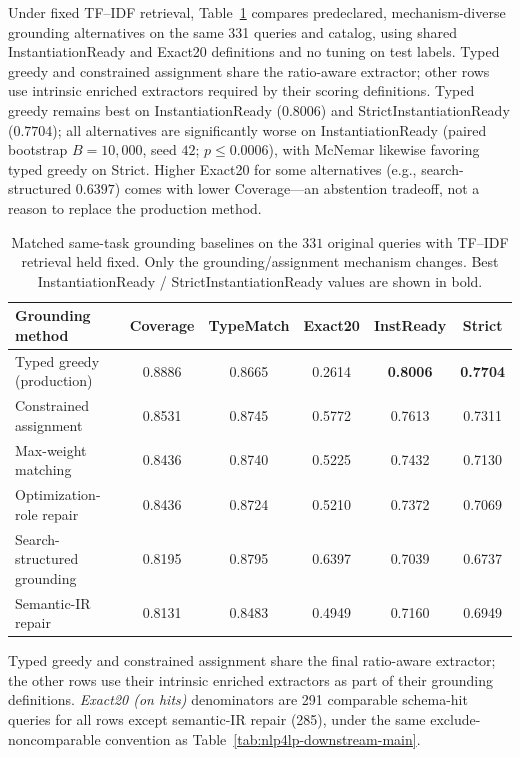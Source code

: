 \documentclass[pdflatex,sn-basic,Numbered]{sn-jnl}
\begin{document}
Under fixed TF--IDF retrieval, Table~\ref{tab:nlp4lp-grounding-baselines} compares predeclared, mechanism-diverse grounding alternatives on the same 331 queries and catalog, using shared InstantiationReady and Exact20 definitions and no tuning on test labels. Typed greedy and constrained assignment share the ratio-aware extractor; other rows use intrinsic enriched extractors required by their scoring definitions. Typed greedy remains best on InstantiationReady ($0.8006$) and StrictInstantiationReady ($0.7704$); all alternatives are significantly worse on InstantiationReady (paired bootstrap $B=10{,}000$, seed $42$; $p\leq 0.0006$), with McNemar likewise favoring typed greedy on Strict. Higher Exact20 for some alternatives (e.g., search-structured $0.6397$) comes with lower Coverage---an abstention tradeoff, not a reason to replace the production method.

\begin{table}[t]
  \centering
  \caption{Matched same-task grounding baselines on the $331$ original queries with TF--IDF retrieval held fixed. Only the grounding/assignment mechanism changes. Best InstantiationReady / StrictInstantiationReady values are shown in bold.}
  \label{tab:nlp4lp-grounding-baselines}
  \small
  \setlength{\tabcolsep}{2.8pt}
  \renewcommand{\arraystretch}{1.12}
  \begin{tabular}{@{}lccccc@{}}
    \toprule
    Grounding method & Coverage & TypeMatch & Exact20 & InstReady & Strict \\
    \midrule
    Typed greedy (production) & 0.8886 & 0.8665 & 0.2614 & \textbf{0.8006} & \textbf{0.7704} \\
    Constrained assignment & 0.8531 & 0.8745 & 0.5772 & 0.7613 & 0.7311 \\
    Max-weight matching & 0.8436 & 0.8740 & 0.5225 & 0.7432 & 0.7130 \\
    Optimization-role repair & 0.8436 & 0.8724 & 0.5210 & 0.7372 & 0.7069 \\
    Search-structured grounding & 0.8195 & 0.8795 & 0.6397 & 0.7039 & 0.6737 \\
    Semantic-IR repair & 0.8131 & 0.8483 & 0.4949 & 0.7160 & 0.6949 \\
    \bottomrule
  \end{tabular}

  \vspace{2mm}
  \raggedright
  \footnotesize
  Typed greedy and constrained assignment share the final ratio-aware extractor; the other rows use their intrinsic enriched extractors as part of their grounding definitions. \textit{Exact20 (on hits)} denominators are 291 comparable schema-hit queries for all rows except semantic-IR repair (285), under the same exclude-noncomparable convention as Table~\ref{tab:nlp4lp-downstream-main}.
\end{table}
\end{document}
